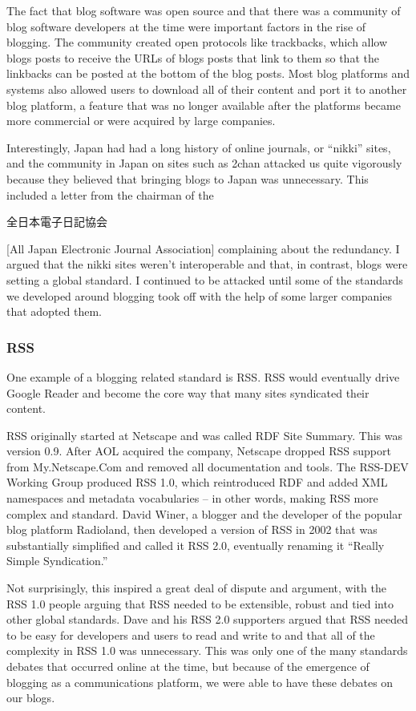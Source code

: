 The fact that blog software was open source and that there was a community of blog software developers at the time were important factors in the rise of blogging. The community created open protocols like trackbacks, which allow blogs posts to receive the \ac{URL}s of blogs posts that link to them so that the linkbacks can be posted at the bottom of the blog posts. Most blog platforms and systems also allowed users to download all of their content and port it to another blog platform, a feature that was no longer available after the platforms became more commercial or were acquired by large companies.

Interestingly, Japan had had a long history of online journals, or ``nikki'' sites, and the community in Japan on sites such as 2chan attacked us quite vigorously because they believed that bringing blogs to Japan was unnecessary. This included a letter from the chairman of the \begin{CJK}{UTF8}{min}全日本電子日記協会\end{CJK} [All Japan Electronic Journal Association] complaining about the redundancy. I argued that the nikki sites weren't interoperable and that, in contrast, blogs were setting a global standard. I continued to be attacked until some of the standards we developed around blogging took off with the help of some larger companies that adopted them.

\subsubsection{RSS}

One example of a blogging related standard is \ac{RSS}. \ac{RSS} would eventually drive Google Reader and become the core way that many sites syndicated their content.

\ac{RSS} originally started at Netscape and was called \ac{RDF} Site Summary. This was version 0.9. After AOL acquired the company, Netscape dropped \ac{RSS} support from My.Netscape.Com and removed all documentation and tools. The \ac{RSS}-DEV Working Group produced \ac{RSS} 1.0, which reintroduced \ac{RDF} and added XML namespaces and metadata vocabularies -- in other words, making \ac{RSS} more complex and standard. David Winer, a blogger and the developer of the popular blog platform Radioland, then developed a version of \ac{RSS} in 2002 that was substantially simplified and called it \ac{RSS} 2.0, eventually renaming it ``Really Simple Syndication.''

Not surprisingly, this inspired a great deal of dispute and argument, with the \ac{RSS} 1.0 people arguing that \ac{RSS} needed to be extensible, robust and tied into other global standards. Dave and his \ac{RSS} 2.0 supporters argued that \ac{RSS} needed to be easy for developers and users to read and write to and that all of the complexity in \ac{RSS} 1.0 was unnecessary. This was only one of the many standards debates that occurred online at the time, but because of the emergence of blogging as a communications platform, we were able to have these debates on our blogs. 

